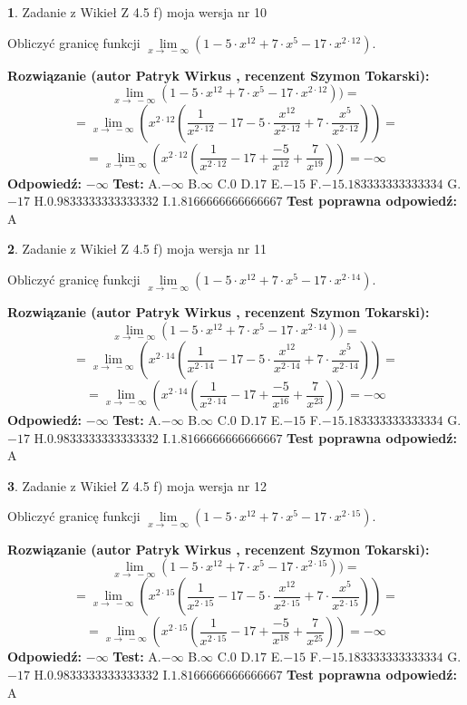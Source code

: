 \documentclass[12pt, a4paper]{article}
\theoremstyle{definition} %
\newtheorem{zad}{}
\newcommand{\zadStart}[1]{\begin{zad}#1\newline}
\newcommand{\zadStop}{\end{zad}}
\newcommand{\rozwStart}[2]{\noindent \textbf{Rozwiązanie (autor #1 , recenzent #2): }\newline}
\newcommand{\rozwStop}{\newline}
\newcommand{\odpStart}{\noindent \textbf{Odpowiedź:}\newline}
\newcommand{\odpStop}{\newline}
\newcommand{\testStart}{\noindent \textbf{Test:}\newline}
\newcommand{\testStop}{\newline}
\newcommand{\kluczStart}{\noindent \textbf{Test poprawna odpowiedź:}\newline}
\newcommand{\kluczStop}{\newline}
\begin{document}
\zadStart{Zadanie z Wikieł Z 4.5 f) moja wersja nr 10}


Obliczyć granicę funkcji  $\lim\limits_{x\to\ -\infty}(1 - 5 \cdot x^{12}+7 \cdot x^{5}- 17 \cdot x^{2\cdot12})$.
\zadStop
\rozwStart{Patryk Wirkus}{Szymon Tokarski}
$$\lim\limits_{x\to\ -\infty}(1 - 5 \cdot x^{12}+7 \cdot x^{5}- 17 \cdot x^{2\cdot12}))=$$
$$=\lim\limits_{x\to\ -\infty}(x^{2\cdot12}(\frac{1}{x^{2\cdot12}}-17 -5 \cdot \frac{x^{12}}{x^{2\cdot12}}+7 \cdot \frac{x^{5}}{x^{2\cdot12}}))=$$
$$=\lim\limits_{x\to\ -\infty}(x^{2\cdot12}(\frac{1}{x^{2\cdot12}}-17 + \frac{-5}{x^{12}}+ \frac{7}{x^{19}}))=-\infty$$
\rozwStop
\odpStart
$-\infty$
\odpStop
\testStart
A.$-\infty$ B.$\infty$ C.$0$ D.$17$ E.$-15$
F.$-15.183333333333334$ G.$-17$
H.$0.9833333333333332$
I.$1.8166666666666667$
\testStop
\kluczStart
A
\kluczStop



\zadStart{Zadanie z Wikieł Z 4.5 f) moja wersja nr 11}


Obliczyć granicę funkcji  $\lim\limits_{x\to\ -\infty}(1 - 5 \cdot x^{12}+7 \cdot x^{5}- 17 \cdot x^{2\cdot14})$.
\zadStop
\rozwStart{Patryk Wirkus}{Szymon Tokarski}
$$\lim\limits_{x\to\ -\infty}(1 - 5 \cdot x^{12}+7 \cdot x^{5}- 17 \cdot x^{2\cdot14}))=$$
$$=\lim\limits_{x\to\ -\infty}(x^{2\cdot14}(\frac{1}{x^{2\cdot14}}-17 -5 \cdot \frac{x^{12}}{x^{2\cdot14}}+7 \cdot \frac{x^{5}}{x^{2\cdot14}}))=$$
$$=\lim\limits_{x\to\ -\infty}(x^{2\cdot14}(\frac{1}{x^{2\cdot14}}-17 + \frac{-5}{x^{16}}+ \frac{7}{x^{23}}))=-\infty$$
\rozwStop
\odpStart
$-\infty$
\odpStop
\testStart
A.$-\infty$ B.$\infty$ C.$0$ D.$17$ E.$-15$
F.$-15.183333333333334$ G.$-17$
H.$0.9833333333333332$
I.$1.8166666666666667$
\testStop
\kluczStart
A
\kluczStop



\zadStart{Zadanie z Wikieł Z 4.5 f) moja wersja nr 12}


Obliczyć granicę funkcji  $\lim\limits_{x\to\ -\infty}(1 - 5 \cdot x^{12}+7 \cdot x^{5}- 17 \cdot x^{2\cdot15})$.
\zadStop
\rozwStart{Patryk Wirkus}{Szymon Tokarski}
$$\lim\limits_{x\to\ -\infty}(1 - 5 \cdot x^{12}+7 \cdot x^{5}- 17 \cdot x^{2\cdot15}))=$$
$$=\lim\limits_{x\to\ -\infty}(x^{2\cdot15}(\frac{1}{x^{2\cdot15}}-17 -5 \cdot \frac{x^{12}}{x^{2\cdot15}}+7 \cdot \frac{x^{5}}{x^{2\cdot15}}))=$$
$$=\lim\limits_{x\to\ -\infty}(x^{2\cdot15}(\frac{1}{x^{2\cdot15}}-17 + \frac{-5}{x^{18}}+ \frac{7}{x^{25}}))=-\infty$$
\rozwStop
\odpStart
$-\infty$
\odpStop
\testStart
A.$-\infty$ B.$\infty$ C.$0$ D.$17$ E.$-15$
F.$-15.183333333333334$ G.$-17$
H.$0.9833333333333332$
I.$1.8166666666666667$
\testStop
\kluczStart
A
\kluczStop
\end{document}
